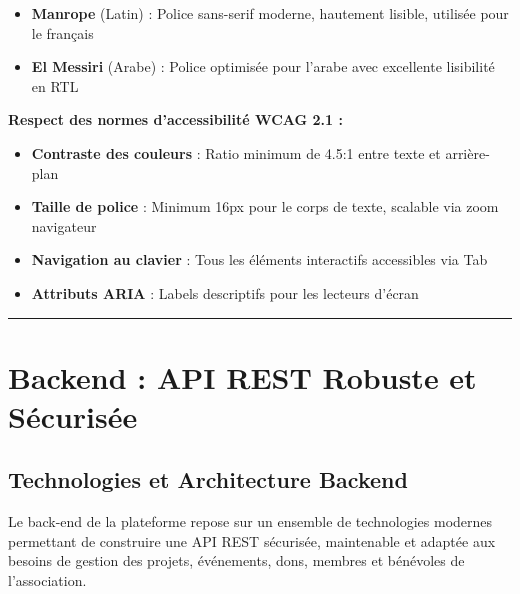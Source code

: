 \documentclass[12pt,a4paper,twoside,openright]{report}
\begin{document}
\begin{itemize}[label=\textcolor{primaryBlue}{$\bullet$}, leftmargin=1.5cm, itemsep=0.3cm]
    \item \textbf{Manrope} (Latin) : Police sans-serif moderne, hautement lisible, utilisée pour le français
    \item \textbf{El Messiri} (Arabe) : Police optimisée pour l'arabe avec excellente lisibilité en RTL
\end{itemize}

\vspace{0.3cm}

\textbf{Respect des normes d'accessibilité WCAG 2.1 :}
\begin{itemize}[label=\textcolor{primaryBlue}{$\circ$}, leftmargin=1.5cm, itemsep=0.25cm]
    \item \textbf{Contraste des couleurs} : Ratio minimum de 4.5:1 entre texte et arrière-plan
    \item \textbf{Taille de police} : Minimum 16px pour le corps de texte, scalable via zoom navigateur
    \item \textbf{Navigation au clavier} : Tous les éléments interactifs accessibles via Tab
    \item \textbf{Attributs ARIA} : Labels descriptifs pour les lecteurs d'écran
\end{itemize}

\vspace{0.5cm}
\noindent\textcolor{primaryBlue!25}{\rule{\textwidth}{0.5pt}}
\vspace{0.4cm}

\section{Backend : API REST Robuste et Sécurisée}

\subsection{Technologies et Architecture Backend}



Le back-end de la plateforme repose sur un ensemble de technologies modernes permettant de construire une API REST sécurisée, maintenable et adaptée aux besoins de gestion des projets, événements, dons, membres et bénévoles de l'association.
\end{document}

